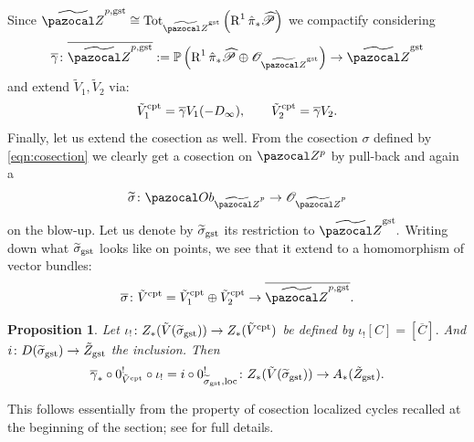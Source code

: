 \documentclass[11pt]{amsart}
\newcommand{\PP}{\mathbb P}
\newcommand{\OO}{\mathcal O}
\renewcommand{\to}{\rightarrow}
\newcommand{\Z}{\pazocal Z}
\newcommand{\tZ}{\widetilde{\pazocal Z}}
\newcommand{\tZp}{\widetilde{\pazocal Z}^p}
\newcommand{\R}{\operatorname{R}}
\theoremstyle{plain}
\newtheorem{prop}[thm]{Proposition}
\theoremstyle{definition}
\begin{document}
Since $\tZ^{p,\rm{gst}}\cong\operatorname{Tot}_{\tZ^{\rm{gst}}}\left(\R^1\hat{\pi}_*\widehat{\mathcal P}\right)$ we compactify considering
\[\overline{\gamma}\colon \overline{\tZ^{p,\rm{gst}}}:=\PP\left(\R^1\hat{\pi}_*\widehat{\mathcal P}\oplus \OO_{\tZ^{\rm{gst}}}\right)\to \tZ^{\rm{gst}}\]
and extend $\tilde{V}_1,\tilde{V}_2$ via:
\[\tilde{V}^{\rm{cpt}}_1=\overline{\gamma}V_1(-D_{\infty}),\qquad \tilde{V}^{\rm{cpt}}_2=\overline{\gamma}V_2.\]
Finally, let us extend the cosection as well. From the cosection $\sigma$ defined by \ref{eqn:cosection} we clearly get a cosection on $\Z^p$ by pull-back and again a 
\[\widetilde{\sigma}\colon \pazocal Ob_{\tZp}\to\OO_{\tZp} \]
 on the blow-up. Let us denote by $\widetilde{\sigma}_{\rm{gst}}$ its restriction to $\tZ^{\rm{gst}}.$
 Writing down what $\widetilde{\sigma}_{\rm{gst}}$ looks like on points\cite[Lemma~6.2]{CL}, we see that it extend to a homomorphism of vector bundles:
 \[\overline{\sigma}\colon\tilde{V}^{\rm{cpt}}=\tilde{V}^{\rm{cpt}}_1\oplus \tilde{V}^{\rm{cpt}}_2\to \overline{\tZ^{p,\rm{gst}}}.\]
 \begin{prop}
 Let $\iota_{!}\colon Z_*(\tilde{V}(\widetilde{\sigma}_{\rm{gst}}))\to Z_*(\tilde{V}^{\rm{cpt}})$ be defined by 
 $\iota_{!}[C]=[\overline{C}].$ And $i\colon D(\widetilde{\sigma}_{\rm{gst}})\to \tilde{Z}_{\rm{gst}}$ the inclusion. Then
 \[\overline{\gamma}_*\circ 0^{!}_{\tilde{V}^{\rm{cpt}}}\circ\iota_{!}=i\circ 0^{!}_{\widetilde{\sigma}_{\rm{gst}},\rm{loc}}\colon  Z_*(\tilde{V}(\widetilde{\sigma}_{\rm{gst}}))\to A_*(\tilde{Z}_{\rm{gst}}).\]
 \end{prop}
 This follows essentially from the property of cosection localized cycles recalled at the beginning of the section; see \cite[Proposition~6.4]{CL} for full details.
\end{document}
